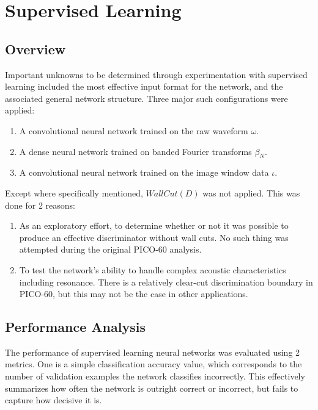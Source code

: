 \documentclass[10pt]{article}
\begin{document}
\section{Supervised Learning}

\subsection{Overview}

Important unknowns to be determined through experimentation with supervised learning included the most effective input format for the network, and the associated general network structure. Three major such configurations were applied:

\begin{enumerate}
    \item A convolutional neural network trained on the raw waveform $\omega$.
    \item A dense neural network trained on banded Fourier transforms $\beta_{N}$.
    \item A convolutional neural network trained on the image window data $\iota$.
\end{enumerate}

Except where specifically mentioned, $WallCut(D)$ was not applied. This was done for 2 reasons:

\begin{enumerate}
    \item As an exploratory effort, to determine whether or not it was possible to produce an effective discriminator without wall cuts. No such thing was attempted during the original PICO-60 analysis.
    \item To test the network's ability to handle complex acoustic characteristics including resonance. There is a relatively clear-cut discrimination boundary in PICO-60, but this may not be the case in other applications.
\end{enumerate}

\subsection{Performance Analysis}

The performance of supervised learning neural networks was evaluated using 2 metrics. One is a simple classification accuracy value, which corresponds to the number of validation examples the network classifies incorrectly. This effectively summarizes how often the network is outright correct or incorrect, but fails to capture how decisive it is.
\end{document}
